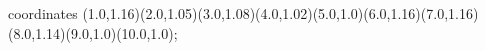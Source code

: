 					coordinates { (1.0,1.16)(2.0,1.05)(3.0,1.08)(4.0,1.02)(5.0,1.0)(6.0,1.16)(7.0,1.16)(8.0,1.14)(9.0,1.0)(10.0,1.0)};